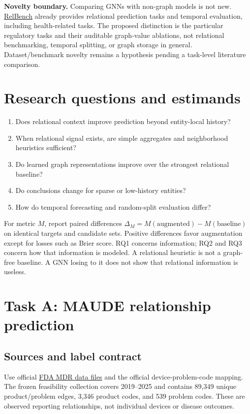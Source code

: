 \documentclass[11pt,a4paper]{article}
\begin{document}
\textbf{Novelty boundary.} Comparing GNNs with non-graph models is not new. \href{https://relbench.stanford.edu/}{RelBench} already provides relational prediction tasks and temporal evaluation, including health-related tasks. The proposed distinction is the particular regulatory tasks and their auditable graph-value ablations, not relational benchmarking, temporal splitting, or graph storage in general. Dataset/benchmark novelty remains a hypothesis pending a task-level literature comparison.

\section{Research questions and estimands}
\begin{enumerate}[label=RQ\arabic*.]
\item Does relational context improve prediction beyond entity-local history?
\item When relational signal exists, are simple aggregates and neighborhood heuristics sufficient?
\item Do learned graph representations improve over the strongest relational baseline?
\item Do conclusions change for sparse or low-history entities?
\item How do temporal forecasting and random-split evaluation differ?
\end{enumerate}
For metric $M$, report paired differences $\Delta_M=M(\text{augmented})-M(\text{baseline})$ on identical targets and candidate sets. Positive differences favor augmentation except for losses such as Brier score. RQ1 concerns information; RQ2 and RQ3 concern how that information is modeled. A relational heuristic is not a graph-free baseline. A GNN losing to it does not show that relational information is useless.

\section{Task A: MAUDE relationship prediction}
\subsection{Sources and label contract}
Use official \href{https://www.fda.gov/medical-devices/medical-device-reporting-mdr-how-report-medical-device-problems/mdr-data-files}{FDA MDR data files} and the official device-problem-code mapping. The frozen feasibility collection covers 2019--2025 and contains 89,349 unique product/problem edges, 3,346 product codes, and 539 problem codes. These are observed reporting relationships, not individual devices or disease outcomes.
\end{document}
